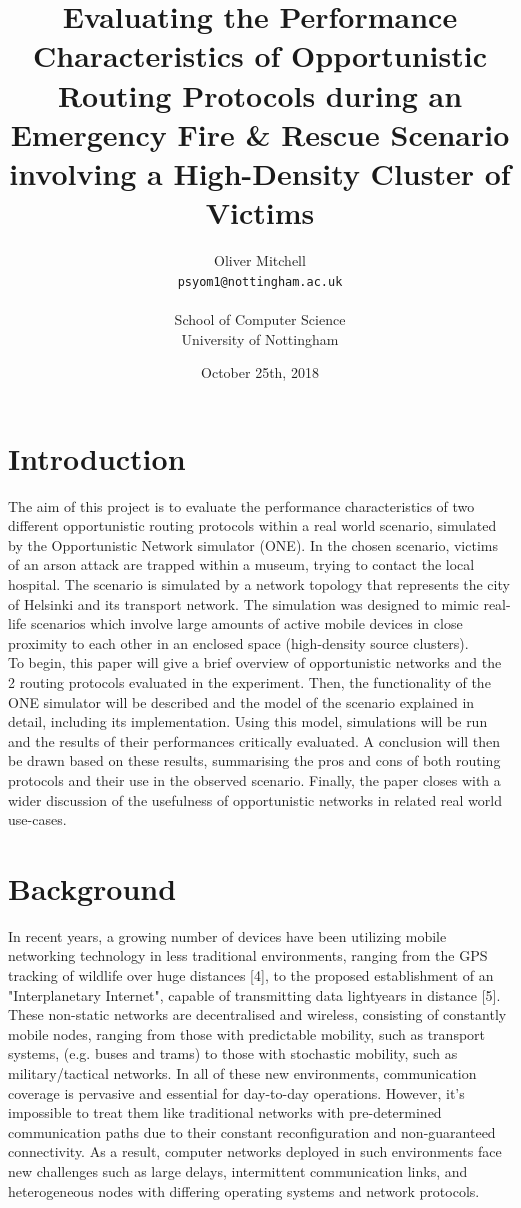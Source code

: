 \documentclass{article}
\title{Evaluating the Performance Characteristics of Opportunistic Routing Protocols during an Emergency Fire \& Rescue Scenario involving a High-Density Cluster of Victims}
\author{
  Oliver Mitchell\\
  \texttt{psyom1@nottingham.ac.uk}\\\\
  \textnormal{School of Computer Science}\\
  \textnormal{University of Nottingham}
}
\date{October 25th, 2018}
\begin{document}
\maketitle
 
\tableofcontents
\newpage

\section{Introduction}
The aim of this project is to evaluate the performance characteristics of two different opportunistic routing protocols within a real world scenario, simulated by the Opportunistic Network simulator (ONE). In the chosen scenario, victims of an arson attack are trapped within a museum, trying to contact the local hospital. The scenario is simulated by a network topology that represents the city of Helsinki and its transport network. The simulation was designed to mimic real-life scenarios which involve large amounts of active mobile devices in close proximity to each other in an enclosed space (high-density source clusters).\\
\newline
To begin, this paper will give a brief overview of opportunistic networks and the 2 routing protocols evaluated in the experiment. Then, the functionality of the ONE simulator will be described and the model of the scenario explained in detail, including its implementation. Using this model, simulations will be run and the results of their performances critically evaluated. A conclusion will then be drawn based on these results, summarising the pros and cons of both routing protocols and their use in the observed scenario. Finally, the paper closes with a wider discussion of the usefulness of opportunistic networks in related real world use-cases.

\section{Background}
In recent years, a growing number of devices have been utilizing mobile networking technology in less traditional environments, ranging from the GPS tracking of wildlife over huge distances [4], to the proposed establishment of an "Interplanetary Internet", capable of transmitting data lightyears in distance [5]. These non-static networks are decentralised and wireless, consisting of constantly mobile nodes, ranging from those with predictable mobility, such as transport systems, (e.g. buses and trams) to those with stochastic mobility, such as military/tactical networks. In all of these new environments, communication coverage is pervasive and essential for day-to-day operations. However, it's impossible to treat them like traditional networks with pre-determined communication paths due to their constant reconfiguration and non-guaranteed connectivity. As a result, computer networks deployed in such environments face new challenges such as large delays, intermittent communication links, and heterogeneous nodes with differing operating systems and network protocols.
\end{document}
